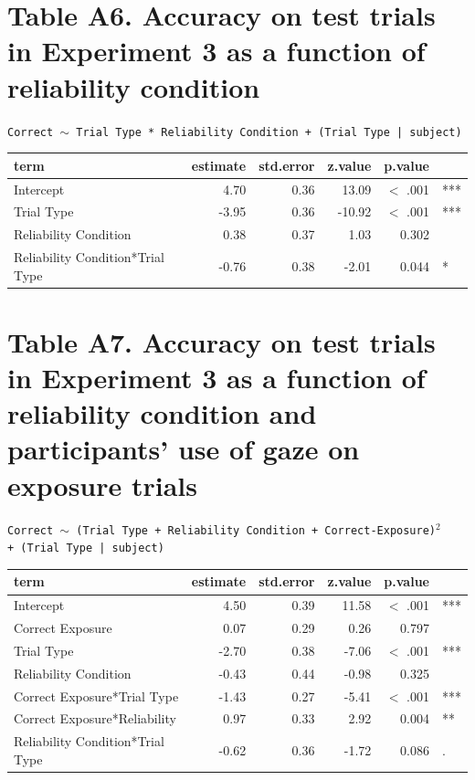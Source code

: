 \documentclass[authoryear, review]{elsarticle}
\begin{document}
\section*{Table A6. Accuracy on test trials in Experiment 3 as a function of reliability condition}

\texttt{Correct $\sim$ Trial Type * Reliability Condition + (Trial Type | subject)}

\begin{table}[h]
\centering
\begin{tabular}{lrrrrl}
 term & estimate & std.error & z.value & p.value &  \\ 
  \hline
Intercept & 4.70 & 0.36 & 13.09 & $<$ .001 & *** \\ 
  Trial Type & -3.95 & 0.36 & -10.92 & $<$ .001 & *** \\ 
  Reliability Condition & 0.38 & 0.37 & 1.03 & 0.302 &  \\ 
  Reliability Condition*Trial Type & -0.76 & 0.38 & -2.01 & 0.044 & * \\ 
   \hline
\end{tabular}
\label{tab:e3_acc_rel_cond}
\end{table}

\newpage

\section*{Table A7. Accuracy on test trials in Experiment 3 as a function of reliability condition and participants' use of gaze on exposure trials}

\texttt{Correct $\sim$ (Trial Type + Reliability Condition + Correct-Exposure)$^2$ \\ + (Trial Type | subject)}

\begin{table}[h]
\centering
\begin{tabular}{lrrrrl}
 term & estimate & std.error & z.value & p.value &  \\ 
  \hline
Intercept & 4.50 & 0.39 & 11.58 & $<$ .001 & *** \\ 
  Correct Exposure & 0.07 & 0.29 & 0.26 & 0.797 &  \\ 
  Trial Type & -2.70 & 0.38 & -7.06 & $<$ .001 & *** \\ 
  Reliability Condition & -0.43 & 0.44 & -0.98 & 0.325 &  \\ 
  Correct Exposure*Trial Type & -1.43 & 0.27 & -5.41 & $<$ .001 & *** \\ 
  Correct Exposure*Reliability & 0.97 & 0.33 & 2.92 & 0.004 & ** \\ 
  Reliability Condition*Trial Type & -0.62 & 0.36 & -1.72 & 0.086 & . \\ 
   \hline
\end{tabular}
\label{tab:e3_acc_rel_cond_gf}
\end{table}
\end{document}
